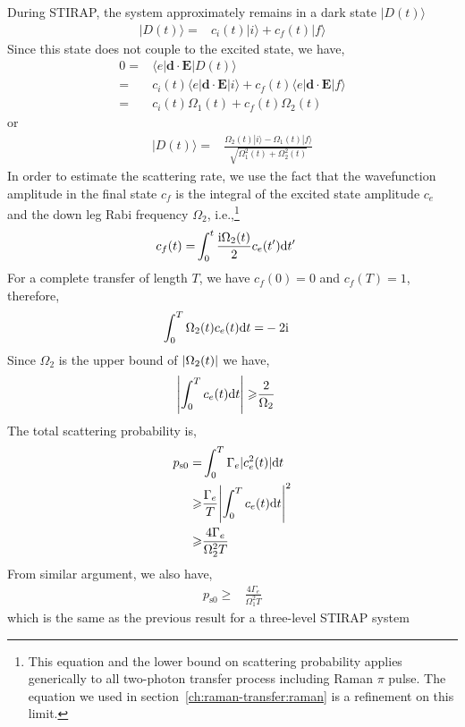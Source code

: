 During STIRAP, the system approximately remains in a dark state $|D(t)\rangle$
\begin{align*}
  |D(t)\rangle=&c_i(t)|i\rangle+c_f(t)|f\rangle
\end{align*}
Since this state does not couple to the excited state, we have,
\begin{align*}
  0=&\langle e|\mathbf{d}\cdot\mathbf{E}|D(t)\rangle\\
  =&c_i(t)\langle e|\mathbf{d}\cdot\mathbf{E}|i\rangle
     +c_f(t)\langle e|\mathbf{d}\cdot\mathbf{E}|f\rangle\\
  =&c_i(t)\Omega_1(t)+c_f(t)\Omega_2(t)
\end{align*}
or
\begin{align*}
  |D(t)\rangle=&\frac{\Omega_2(t)|i\rangle-\Omega_1(t)|f\rangle}{\sqrt{\Omega_1^2(t)+\Omega_2^2(t)}}
\end{align*}
In order to estimate the scattering rate,
we use the fact that the wavefunction amplitude in the final state $c_f$
is the integral of the excited state amplitude $c_e$ and the down leg Rabi frequency $\Omega_2$,
i.e.,\footnote{This equation and the lower bound on scattering probability applies generically
  to all two-photon transfer process including Raman $\pi$ pulse.
  The equation we used in section~\ref{ch:raman-transfer:raman} is a refinement
  on this limit.}
\begin{align*}
  c_f(t)=&\int_0^t \frac{\mathrm{i}\Omega_2(t)}{2}c_e(t') \mathrm{d} t'
\end{align*}
For a complete transfer of length $T$, we have $c_f(0)=0$ and $c_f(T)=1$, therefore,
\begin{align*}
  \int_0^T\Omega_2(t)c_e(t)\mathrm{d} t=&-2\mathrm{i}
\end{align*}
Since $\Omega_2$ is the upper bound of ${\left|{\Omega_2(t)}\right|}$ we have,
\begin{align*}
  {\left|{\int_0^Tc_e(t)\mathrm{d}t}\right|}\geqslant&\frac{2}{\Omega_2}
\end{align*}
The total scattering probability is,
\begin{align*}
  p_{\mathrm{s}0}=&\int_0^T \Gamma_e|c_e^2(t)| \mathrm{d} t\\
  \geqslant&\frac{\Gamma_e}{T}{\left|{\int_0^T c_e(t) \mathrm{d} t}\right|}^2\\
  \geqslant&\frac{4\Gamma_e}{\Omega_2^2T}
\end{align*}
From similar argument, we also have,
\begin{align*}
  p_{\mathrm{s}0}\geqslant&\frac{4\Gamma_e}{\Omega_1^2T}
\end{align*}
which is the same as the previous result for a three-level STIRAP system
